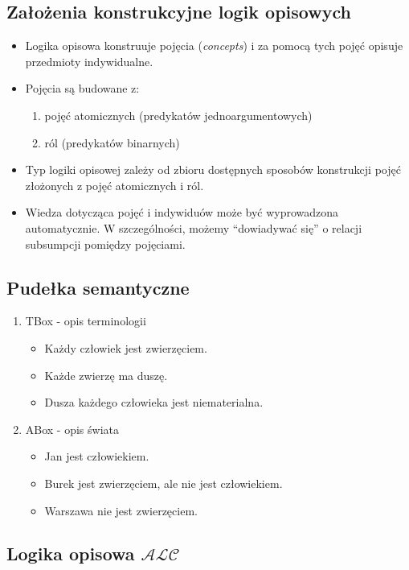 \documentclass[12pt]{article}
\begin{document}
\subsection{Założenia konstrukcyjne logik opisowych}
%
\begin{itemize}
\item Logika opisowa konstruuje pojęcia (\emph{concepts}) i za pomocą tych pojęć opisuje przedmioty indywidualne.
%
\item Pojęcia są budowane z:
\begin{enumerate}
\item pojęć atomicznych (predykatów jednoargumentowych)
\item ról (predykatów binarnych)
\end{enumerate}
%
\item Typ logiki opisowej zależy od zbioru dostępnych sposobów konstrukcji pojęć złożonych z pojęć atomicznych i ról.
%
\item Wiedza dotycząca pojęć i indywiduów może być wyprowadzona automatycznie. W szczególności, możemy ``dowiadywać się'' o relacji subsumpcji pomiędzy pojęciami.
\end{itemize}
%

\subsection{Pudełka semantyczne}
%
\begin{enumerate}
\item TBox - opis terminologii
\begin{itemize}
\item Każdy człowiek jest zwierzęciem.
\item Każde zwierzę ma duszę.
\item Dusza każdego człowieka jest niematerialna.
\end{itemize}
%
\item ABox - opis świata
\begin{itemize}
\item Jan jest człowiekiem.
\item Burek jest zwierzęciem, ale nie jest człowiekiem.
\item Warszawa nie jest zwierzęciem.
\end{itemize}
\end{enumerate}
%

\subsection{Logika opisowa $\mathcal{ALC}$}
\end{document}
